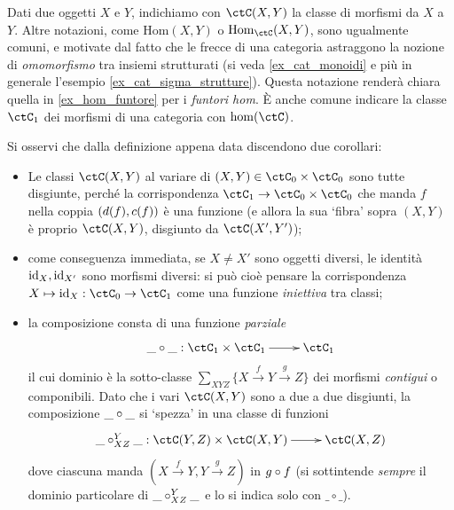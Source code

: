 \begin{notation}
	Dati due oggetti \(X\) e \(Y\), indichiamo con \(\Hom{\ctC}(X,Y)\) la classe di morfismi da \(X\) a \(Y\). Altre notazioni, come \(\mathrm{Hom}(X,Y)\) o \(\mathrm{Hom}_\ctC(X,Y)\), sono ugualmente comuni, e motivate dal fatto che le frecce di una categoria astraggono la nozione di \emph{omomorfismo} tra insiemi strutturati (si veda \ref{ex_cat_monoidi} e più in generale l'esempio \ref{ex_cat_sigma_strutture}). Questa notazione renderà chiara quella in \ref{ex_hom_funtore} per i \emph{funtori hom}. \`E anche comune indicare la classe $\ctC_1$ dei morfismi di una categoria con $\hom(\ctC)$.
\end{notation}
\begin{remark}\label{cor_def_categ}
	Si osservi che dalla definizione appena data discendono due corollari:
	\begin{itemize}
		\item Le classi \(\Hom{\ctC}(X,Y)\) al variare di \((X,Y)\in\ctC_0\times\ctC_0\) sono tutte disgiunte, perché la corrispondenza \(\ctC_1 \to \ctC_0\times\ctC_0\) che manda \(f\) nella coppia \((d(f),c(f))\) è una funzione (e allora la sua `fibra' sopra \((X,Y)\) è proprio \(\Hom{\ctC}(X,Y)\), disgiunto da \(\Hom{\ctC}(X',Y')\));
		\item come conseguenza immediata, se \(X\ne X'\) sono oggetti diversi, le identità \(\mathrm{id}_X,\mathrm{id}_{X'}\) sono morfismi diversi: si può cioè pensare la corrispondenza \(X\mapsto \id_X : \ctC_0\to\ctC_1\) come una funzione \emph{iniettiva} tra classi;
		\item la composizione consta di una funzione \emph{parziale}
		      \[\xymatrix{\_\cmp\_ : \ctC_1 \times \ctC_1 \ar[r] & \ctC_1}\]
		      il cui dominio è la sotto-classe \(\sum_{XYZ} \{ X \xrightarrow f Y \xrightarrow g Z \}\) dei morfismi \emph{contigui} o componibili. Dato che i vari \(\ctC(X,Y)\) sono a due a due disgiunti, la composizione \(\_\circ\_\) si `spezza' in una classe di funzioni
		      \[\xymatrix{\_\cmp_{XZ}^Y\_ : \ctC(Y,Z)\times\ctC(X,Y) \ar[r] & \ctC(X,Z)}\]
		      dove ciascuna manda \(( X \xrightarrow f Y, Y \xrightarrow g Z )\) in \(g\circ f\) (si sottintende \emph{sempre} il dominio particolare di \(\_\circ_{XZ}^Y\_\) e lo si indica solo con $\_\circ\_$).
	\end{itemize}
\end{remark}
